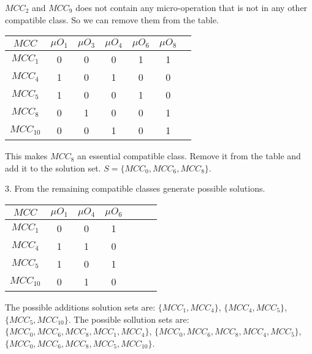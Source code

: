 $MCC_{2}$ and $MCC_{9}$ does not contain any micro-operation that is not in any other compatible class. So we can remove them from the table.   
\begin{table}[H]
    \centering
        \begin{tabular}{|c|c|c|c|c|c|c|}
            \hline
            $MCC$ & $\mu O_{1}$ & $\mu O_{3}$ & $\mu O_{4}$ & $\mu O_{6}$ & $\mu O_{8}$ \\ \hline
            $MCC_{1}$ & 0 & 0 & 0 & 1 & 1 \\ \hline
            $MCC_{4}$ & 1 & 0 & 1 & 0 & 0 \\ \hline
            $MCC_{5}$ & 1 & 0 & 0 & 1 & 0 \\ \hline
            $MCC_{8}$ & 0 & 1 & 0 & 0 & 1 \\ \hline
            $MCC_{10}$ & 0 & 0 & 1 & 0 & 1 \\ \hline
        \end{tabular}
\end{table}
This makes $MCC_{8}$ an essential compatible class. Remove it from the table and add it to the solution set.
$S = \{MCC_{0}, MCC_{6}, MCC_{8}\}$.

3. From the remaining compatible classes generate possible solutions.

\begin{table}[H]
    \centering
        \begin{tabular}{|c|c|c|c|c|c|c|}
            \hline
            $MCC$ & $\mu O_{1}$ & $\mu O_{4}$ & $\mu O_{6}$ \\ \hline
            $MCC_{1}$ & 0 & 0 & 1 \\ \hline
            $MCC_{4}$ & 1 & 1 & 0 \\ \hline
            $MCC_{5}$ & 1 & 0 & 1 \\ \hline
            $MCC_{10}$ & 0 & 1 & 0 \\ \hline
        \end{tabular}
\end{table}
The possible additions solution sets are: $\{MCC_{1}, MCC_{4}\}$, $\{MCC_{4}, MCC_{5}\}$, $\{MCC_{5}, MCC_{10}\}$.
The possible sollution sets are: $\{MCC_{0}, MCC_{6}, MCC_{8}, MCC_{1}, MCC_{4}\}$, $\{MCC_{0}, MCC_{6}, MCC_{8}, MCC_{4}, MCC_{5}\}$, $\{MCC_{0}, MCC_{6}, MCC_{8}, MCC_{5}, MCC_{10}\}$.

